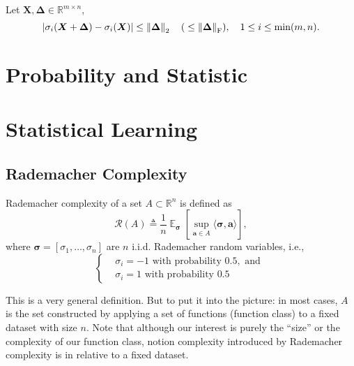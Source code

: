 \documentclass[11pt,a4paper]{article}
\begin{document}
\begin{lemma}
    \label{lemma:perturbation_theory}
    Let $\bm{X}, \boldsymbol \Delta \in \mathbb{R}^{m \times n}$, 
    \[
    \left\lvert\sigma_{i}(\bm{X}+ \boldsymbol \Delta) -\sigma_{i}(\bm{X})\right\rvert \leq \left\lVert\boldsymbol \Delta\right\rVert_{2} \quad (\; \leq \left\lVert\boldsymbol \Delta\right\rVert_{\rm F}), \quad 1 \leq i \leq \min (m, n).
    \] 
\end{lemma}

\section{Probability and Statistic}%
\label{sec:probability_and_statistic}

\section{Statistical Learning}%
\label{sec:statistical_learning}

\subsection{Rademacher Complexity}%
\label{sub:rademacher_complexity}
\begin{definition}
    Rademacher complexity of a set $A \subset \mathbb{R}^{n}$ is defined as
    \[
    \mathcal{R}(A) \triangleq \dfrac{1}{n} \mathop{\mathbb{E}}_{\boldsymbol \sigma} \left[ \sup_{\bm{a} \in A} \langle \boldsymbol \sigma, \bm{a} \rangle\right],
    \] 
    where $\boldsymbol \sigma = [\sigma_1, \ldots , \sigma_n]$ are $n$ i.i.d. Rademacher random variables, i.e., 
    \[
    \begin{cases}
    &\sigma_i = -1 \text{ with probability } 0.5, \text{ and } \\
    &\sigma_i = 1 \text{ with probability  } 0.5
    \end{cases} 
    \] 
\end{definition}
This is a very general definition. But to put it into the picture: 
in most cases, $A$ is the set constructed by applying a set of functions (function class) to a fixed dataset with size $n$.
Note that although our interest is purely the ``size'' or the complexity of our function class, notion complexity introduced by Rademacher complexity is in relative to a fixed dataset.
\end{document}
